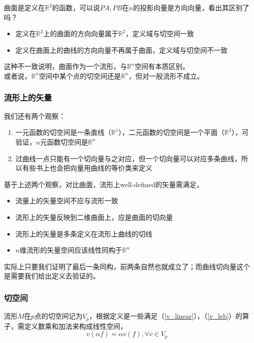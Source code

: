 \documentclass[hpyerref,UTF8,a4paper,titlepage,12pt,oneside]{ctexbook}
\theoremstyle{definition}
\begin{document}
曲面是定义在$\mathbb{R}^2$的函数，可以说$PA,PB$在$n$的投影向量是方向向量，看出其区别了吗？

\begin{itemize}
\item 定义在$\mathbb{R}^2$上的曲面的方向向量属于$\mathbb{R}^2$，定义域与切空间一致
\item 定义在曲面上的曲线的方向向量不再属于曲面，定义域与切空间不一致
\end{itemize}

这种不一致说明，曲面作为一个流形，与$\mathbb{R}^n$空间有本质区别。\\

或者说，$\mathbb{R}^n$空间中某个点的切空间还是$\mathbb{R}^n$，但对一般流形不成立。

\subsubsection*{流形上的矢量}

我们还有两个观察：

\begin{enumerate}
	\item 一元函数的切空间是一条直线（$\mathbb{R}^1$），二元函数的切空间是一个平面（$\mathbb{R}^2$），可验证，$n$元函数切空间是$\mathbb{R}^n$
	\item 过曲线一点只能有一个切向量与之对应，但一个切向量可以对应多条曲线，所以有些书上也会把向量用曲线的等价类来定义
\end{enumerate}

基于上述两个观察，对比曲面，流形上well-defined的矢量需满足，
\begin{itemize}
	\item 流量上的矢量空间不应与流形一致
	\item 流形上的矢量反映到二维曲面上，应是曲面的切向量
	\item 流形上的矢量是多条定义在流形上曲线的切线
	\item $n$维流形的矢量空间应该线性同构于$\mathbb{R}^n$
\end{itemize}

实际上只要我们证明了最后一条同构，前两条自然也就成立了；而曲线切向量这个是需要我们给出定义去验证的。

\subsubsection*{切空间}

	流形$M$在$p$点的切空间记为$V_p$，根据定义是一些满足（\ref{v_linear}），（\ref{v_leb}）的算子，需定义数乘和加法来构成线性空间，
	$$
		v(\alpha f) = \alpha v(f), \forall v \in V_p
	$$
\end{document}
